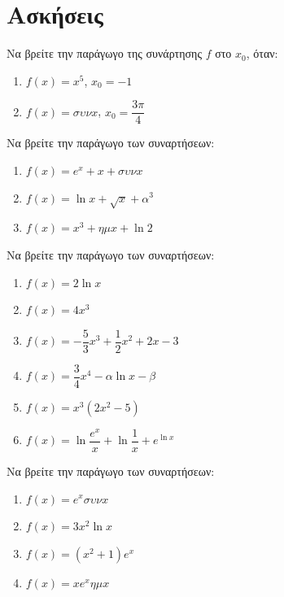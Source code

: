 \documentclass{presentation}
\begin{document}
\section{Ασκήσεις}

\begin{askisi}
  Να βρείτε την παράγωγο της συνάρτησης $f$ στο $x_0$, όταν:
  \begin{enumerate}
    \item<1-> $f(x)=x^5$, $x_0=-1$
    \item<2-> $f(x)=συνx$, $x_0=\dfrac{3π}{4}$
  \end{enumerate}

\end{askisi}

\begin{askisi}
  Να βρείτε την παράγωγο των συναρτήσεων:
  \begin{enumerate}
    \item<1-> $f(x)=e^x+x+συνx$
    \item<2-> $f(x)=\ln x+\sqrt{x}+α^3$
    \item<3-> $f(x)=x^3+ημx+\ln 2$
  \end{enumerate}

\end{askisi}

\begin{askisi}
  Να βρείτε την παράγωγο των συναρτήσεων:
  \begin{enumerate}
    \item<1-> $f(x)=2\ln x$
    \item<2-> $f(x)=4x^3$
    \item<3-> $f(x)=-\dfrac{5}{3}x^3+\dfrac{1}{2}x^2+2x-3$
    \item<4-> $f(x)=\dfrac{3}{4}x^4-α\ln x-β$
    \item<5-> $f(x)=x^3(2x^2-5)$
    \item<6-> $f(x)=\ln \dfrac{e^x}{x}+\ln \dfrac{1}{x}+e^{\ln x}$
  \end{enumerate}

\end{askisi}

\begin{askisi}
  Να βρείτε την παράγωγο των συναρτήσεων:
  \begin{enumerate}
    \item<1-> $f(x)=e^xσυνx$
    \item<2-> $f(x)=3x^2\ln x$
    \item<3-> $f(x)=(x^2+1)e^x$
    \item<4-> $f(x)=xe^xημx$
  \end{enumerate}

\end{askisi}
\end{document}
